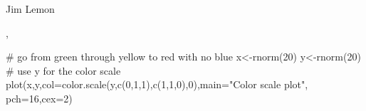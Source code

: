 \begin{Author}\relax
Jim Lemon
\end{Author}
\begin{SeeAlso}\relax
{}, 
\end{SeeAlso}
\begin{Examples}
\begin{ExampleCode}
 # go from green through yellow to red with no blue
 x<-rnorm(20)
 y<-rnorm(20)
 # use y for the color scale
 plot(x,y,col=color.scale(y,c(0,1,1),c(1,1,0),0),main="Color scale plot",
  pch=16,cex=2)
\end{ExampleCode}
\end{Examples}

